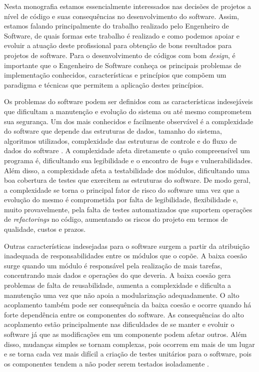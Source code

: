 %

Nesta monografia estamos essencialmente interessados nas decisões de projetos a nível de código e suas consequências no desenvolvimento do software. Assim, estamos falando principalmente do trabalho realizado pelo Engenheiro de Software, de quais formas este trabalho é realizado e como podemos apoiar e evoluir a atuação deste profissional para obtenção de bons resultados para projetos de software. Para o desenvolvimento de códigos com bom \emph{design}, é importante que o Engenheiro de Software conheça os principais problemas de implementação conhecidos, características e princípios que compõem um paradigma e técnicas que permitem a aplicação destes princípios.

%

Os problemas do software podem ser definidos com as características indesejáveis que dificultam a manutenção e evolução do sistema ou até mesmo comprometem sua segurança. Um dos mais conhecidos e facilmente observável é a complexidade do software que depende das estruturas de dados, tamanho do sistema, algoritmos utilizados, complexidade das estruturas de controle e do fluxo de dados do software \cite{basili1983}. A complexidade afeta diretamente o quão compreensível um programa é, dificultando sua legibilidade e o encontro de \emph{bugs} e vulnerabilidades. Além disso, a complexidade afeta a testabilidade dos módulos, dificultando uma boa cobertura de testes que exercitem as estruturas do software. De modo geral, a complexidade se torna o principal fator de risco do software uma vez que a evolução do mesmo é comprometida por falta de legibilidade, flexibilidade e, muito provavelmente, pela falta de testes automatizados que suportem operações de \emph{refactorings} no código, aumentando os riscos do projeto em termos de qualidade, custos e prazos.

%

Outras características indesejadas para o software surgem a partir da atribuição inadequada de responsabilidades entre os módulos que o copõe. A baixa coesão surge quando um módulo é responsável pela realização de mais tarefas, concentrando mais dados e operações do que deveria. A baixa coesão gera problemas de falta de reusabilidade, aumenta a complexidade e dificulta a manutenção uma vez que não apoia a modularização adequadamente. O alto acoplamento também pode ser consequência da baixa coesão e ocorre quando há forte dependência entre os componentes do software. As consequências do alto acoplamento estão principalmente nas dificuldades de se manter e evoluir o software já que as modificações em um componente podem afetar outros. Além disso, mudanças simples se tornam complexas, pois ocorrem em mais de um lugar e se torna cada vez mais difícil a criação de testes unitários para o software, pois os componentes tendem a não poder serem testados isoladamente \cite{martensson2005}.

